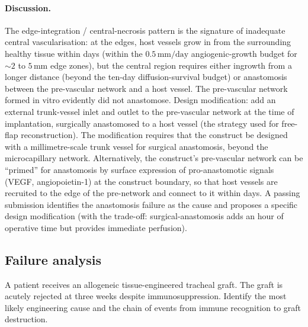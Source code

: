 \paragraph{Discussion.} The edge-integration / central-necrosis
pattern is the signature of inadequate central vascularisation: at
the edges, host vessels grow in from the surrounding healthy tissue
within days (within the $0.5\,\text{mm/day}$ angiogenic-growth
budget for $\sim 2$ to $5\,\text{mm}$ edge zones), but the central
region requires either ingrowth from a longer distance (beyond the
ten-day diffusion-survival budget) or anastomosis between the
pre-vascular network and a host vessel. The pre-vascular network
formed in vitro evidently did not anastomose. Design modification:
add an external trunk-vessel inlet and outlet to the pre-vascular
network at the time of implantation, surgically anastomosed to a
host vessel (the strategy used for free-flap reconstruction). The
modification requires that the construct be designed with a
millimetre-scale trunk vessel for surgical anastomosis, beyond the
microcapillary network. Alternatively, the construct's
pre-vascular network can be ``primed'' for anastomosis by surface
expression of pro-anastomotic signals (VEGF, angiopoietin-1) at
the construct boundary, so that host vessels are recruited to the
edge of the pre-network and connect to it within days. A passing
submission identifies the anastomosis failure as the cause and
proposes a specific design modification (with the trade-off:
surgical-anastomosis adds an hour of operative time but provides
immediate perfusion).

\subsection*{Failure analysis}

\begin{exercise}
A patient receives an allogeneic tissue-engineered tracheal graft.
The graft is acutely rejected at three weeks despite immunosuppression.
Identify the most likely engineering cause and the chain of events
from immune recognition to graft destruction.
\end{exercise}

